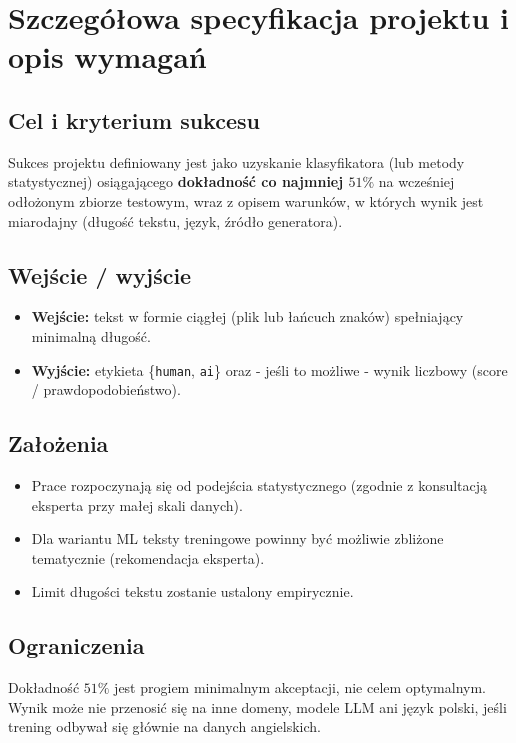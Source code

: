 \section{Szczegółowa specyfikacja projektu i opis wymagań}

\subsection{Cel i kryterium sukcesu}

Sukces projektu definiowany jest jako uzyskanie klasyfikatora (lub metody statystycznej) osiągającego \textbf{dokładność co najmniej $51\%$} na wcześniej odłożonym zbiorze testowym, wraz z opisem warunków, w których wynik jest miarodajny (długość tekstu, język, źródło generatora).

\subsection{Wejście / wyjście}

\begin{itemize}
	\item \textbf{Wejście:} tekst w formie ciągłej (plik lub łańcuch znaków) spełniający minimalną długość.
	\item \textbf{Wyjście:} etykieta \{\texttt{human}, \texttt{ai}\} oraz - jeśli to możliwe - wynik liczbowy (score / prawdopodobieństwo).
\end{itemize}

\subsection{Założenia}

\begin{itemize}
	\item Prace rozpoczynają się od podejścia statystycznego (zgodnie z konsultacją eksperta przy małej skali danych).
	\item Dla wariantu ML teksty treningowe powinny być możliwie zbliżone tematycznie (rekomendacja eksperta).
	\item Limit długości tekstu zostanie ustalony empirycznie.
\end{itemize}

\subsection{Ograniczenia}

Dokładność $51\%$ jest progiem minimalnym akceptacji, nie celem optymalnym. Wynik może nie przenosić się na inne domeny, modele LLM ani język polski, jeśli trening odbywał się głównie na danych angielskich.
